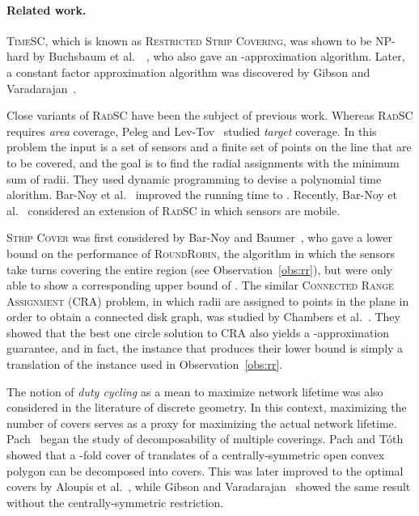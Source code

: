 \documentclass[11pt]{article}
\newcommand{\strip}{\textsc{Strip Cover}\xspace}
\newcommand{\srsc}{\textsc{RadSC}\xspace}
\newcommand{\stsc}{\textsc{TimeSC}\xspace}
\newcommand{\rr}{\textsc{RoundRobin}\xspace}
\begin{document}
\paragraph*{\bf Related work.}
\stsc,
which is known as \textsc{Restricted Strip Covering},
was shown to be NP-hard by Buchsbaum et
al.~~\cite{buchsbaum2007restricted}, who also gave an -approximation algorithm.  Later, a constant factor approximation
algorithm was discovered by Gibson and
Varadarajan~\cite{gibson2009decomposing}.



Close variants of \srsc have been the subject of previous work.
Whereas \srsc requires \emph{area} coverage, Peleg and
Lev-Tov~\cite{lev2005polynomial} studied \emph{target} coverage.  In
this problem the input is a set of  sensors and a finite set of 
points on the line that are to be covered, and the goal is to find the
radial assignments with the minimum sum of radii.  They used dynamic
programming to devise a polynomial time alorithm.  Bar-Noy et
al.~\cite{bar2009cheap} improved the running time to .
Recently, Bar-Noy et al.~\cite{BRT13} considered an extension of \srsc
in which sensors are mobile.

\strip was first considered by Bar-Noy and
Baumer~\cite{barnoy2011maximizing}, who gave a  lower
bound on the performance of \rr, the algorithm in which the sensors
take turns covering the entire region (see Observation~\ref{obs:rr}),
but were only able to show a corresponding upper bound of .
The similar \textsc{Connected Range Assignment} (CRA) problem, in
which radii are assigned to points in the plane in order to obtain a
connected disk graph, was studied by Chambers et
al.~\cite{chambers2011connecting}. They showed that the best one
circle solution to CRA also yields a -approximation
guarantee, and in fact, the instance that produces their lower bound
is simply a translation of the instance used in
Observation~\ref{obs:rr}.

The notion of \emph{duty cycling} as a mean to maximize network
lifetime was also considered in the literature of discrete geometry.  In
this context, maximizing the number of covers  serves as a proxy
for maximizing the actual network lifetime.
Pach~\cite{pach1986covering} began the study of decomposability of
multiple coverings.
Pach and T\'{o}th~\cite{pach2009decomposition} showed that a -fold
cover of translates of a centrally-symmetric open convex polygon can
be decomposed into  covers. This
was later improved to the optimal  covers by Aloupis et
al.~\cite{aloupis2010decomposition}, while Gibson and
Varadarajan~\cite{gibson2009decomposing} showed the same result
without the centrally-symmetric restriction.
\end{document}
